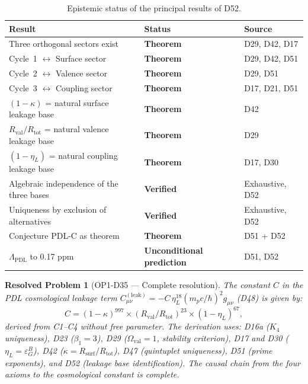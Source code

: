 \documentclass[12pt,a4paper]{article}
\newtheorem{resolvedproblem}{Resolved Problem}
\newcommand{\Kfour}{K_4}
\newcommand{\hb}{\hbar}
\newcommand{\Rsurf}{R_{\mathrm{surf}}}
\newcommand{\Rtot}{R_{\mathrm{tot}}}
\newcommand{\Rval}{R_{\mathrm{val}}}
\newcommand{\kap}{\kappa}
\newcommand{\etaL}{\eta_L}
\newcommand{\Ov}{\Omega_{\mathrm{val}}}
\begin{document}
\begin{table}[H]
\centering
\caption{Epistemic status of the principal results of D52.}
\label{tab:epistemic}
\small
\begin{tabular}{p{8cm}p{3.0cm}p{2.7cm}}
\toprule
Result & Status & Source \\
\midrule
Three orthogonal sectors exist & \textbf{Theorem} & D29, D42, D17 \\
Cycle~1 $\leftrightarrow$ Surface sector & \textbf{Theorem} & D29, D42, D51 \\
Cycle~2 $\leftrightarrow$ Valence sector & \textbf{Theorem} & D29, D51 \\
Cycle~3 $\leftrightarrow$ Coupling sector & \textbf{Theorem} & D17, D21, D51 \\
$(1-\kap)$ = natural surface leakage base & \textbf{Theorem} & D42 \\
$\Rval/\Rtot$ = natural valence leakage base & \textbf{Theorem} & D29 \\
$(1-\etaL)$ = natural coupling leakage base & \textbf{Theorem} & D17, D30 \\
Algebraic independence of the three bases & \textbf{Verified} & Exhaustive, D52 \\
Uniqueness by exclusion of alternatives & \textbf{Verified} & Exhaustive, D52 \\
\midrule
Conjecture PDL-C as theorem & \textbf{Theorem} & D51 + D52 \\
$\Lambda_{\mathrm{PDL}}$ to 0.17 ppm & \textbf{Unconditional prediction} & D51, D52 \\
\bottomrule
\end{tabular}
\end{table}

\begin{resolvedproblem}[OP1-D35 — Complete resolution]
The constant $C$ in the PDL cosmological leakage term $C^{(\mathrm{leak})}_{\mu\nu} = -C\,\etaL^{18}(m_p c/\hb)^2 g_{\mu\nu}$ (D48) is given by:
\[
C = (1-\kap)^{997} \times (\Rval/\Rtot)^{23} \times (1-\etaL)^{67},
\]
derived from C1--C4 without free parameter. The derivation uses: D16a ($\Kfour$ uniqueness), D23 ($\beta_1 = 3$), D29 ($\Ov = 1$, stability criterion), D17 and D30 ($\etaL = \varepsilon_G^B$), D42 ($\kap = \Rsurf/\Rtot$), D47 (quintuplet uniqueness), D51 (prime exponents), and D52 (leakage base identification). The causal chain from the four axioms to the cosmological constant is complete.
\end{resolvedproblem}

\clearpage


\end{document}
